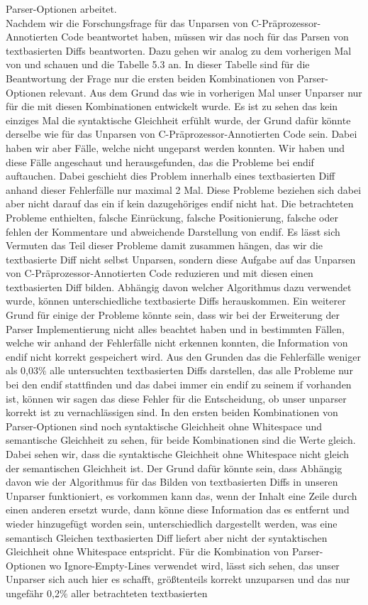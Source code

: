 Parser-Optionen arbeitet.\\

Nachdem wir die Forschungsfrage für das Unparsen von C-Präprozessor-Annotierten Code beantwortet haben, müssen wir das noch für das Parsen von textbasierten Diffs beantworten. Dazu gehen wir analog zu dem vorherigen Mal von und schauen und die Tabelle 5.3 an. In dieser Tabelle sind für die Beantwortung der Frage nur die ersten beiden Kombinationen von Parser-Optionen relevant. Aus dem Grund das wie in vorherigen Mal unser Unparser nur für die mit diesen Kombinationen entwickelt wurde. Es ist zu sehen das kein einziges Mal die syntaktische Gleichheit erfühlt wurde, der Grund dafür könnte derselbe wie für das Unparsen von C-Präprozessor-Annotierten Code sein. Dabei haben wir aber Fälle, welche nicht ungeparst werden konnten. Wir haben und diese Fälle angeschaut und herausgefunden, das die Probleme bei endif auftauchen. Dabei geschieht dies Problem innerhalb eines textbasierten Diff anhand dieser Fehlerfälle nur maximal 2 Mal. Diese Probleme beziehen sich dabei aber nicht darauf das ein if kein dazugehöriges endif nicht hat. Die betrachteten Probleme enthielten, falsche Einrückung, falsche Positionierung, falsche oder fehlen der Kommentare und abweichende Darstellung von endif. Es lässt sich Vermuten das Teil dieser Probleme damit zusammen hängen, das wir die textbasierte Diff nicht selbst Unparsen, sondern diese Aufgabe auf das Unparsen von C-Präprozessor-Annotierten Code reduzieren und mit diesen einen textbasierten Diff bilden. Abhängig davon welcher Algorithmus dazu verwendet wurde, können unterschiedliche textbasierte Diffs herauskommen. Ein weiterer Grund für einige der Probleme könnte sein, dass wir bei der Erweiterung der Parser Implementierung nicht alles beachtet haben und in bestimmten Fällen, welche wir anhand der Fehlerfälle nicht erkennen konnten, die Information von endif nicht korrekt gespeichert wird. Aus den Grunden das die Fehlerfälle weniger als 0,03$\%$ alle untersuchten textbasierten Diffs darstellen, das alle Probleme nur bei den endif stattfinden und das dabei immer ein endif zu seinem if vorhanden ist, können wir sagen das diese Fehler für die Entscheidung, ob unser unparser korrekt ist zu vernachlässigen sind. In den ersten beiden Kombinationen von Parser-Optionen sind noch syntaktische Gleichheit ohne Whitespace und semantische Gleichheit zu sehen, für beide Kombinationen sind die Werte gleich. Dabei sehen wir, dass die syntaktische Gleichheit ohne Whitespace nicht gleich der semantischen Gleichheit ist. Der Grund dafür könnte sein, dass Abhängig davon wie der Algorithmus für das Bilden von textbasierten Diffs in unseren Unparser funktioniert, es vorkommen kann das, wenn der Inhalt eine Zeile durch einen anderen ersetzt wurde, dann könne diese Information das es entfernt und wieder hinzugefügt worden sein, unterschiedlich dargestellt werden, was eine semantisch Gleichen textbasierten Diff liefert aber nicht der syntaktischen Gleichheit ohne Whitespace entspricht. Für die Kombination von Parser-Optionen wo Ignore-Empty-Lines verwendet wird, lässt sich sehen, das unser Unparser sich auch hier es schafft, größtenteils korrekt unzuparsen und das nur ungefähr 0,2$\%$ aller betrachteten textbasierten 
